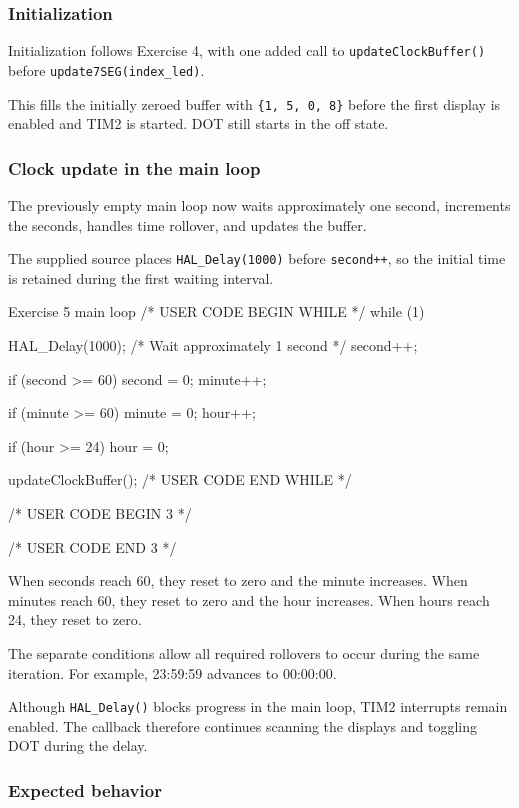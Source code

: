 \documentclass[a4paper]{article}
\begin{document}
\subsubsection{Initialization}

Initialization follows Exercise 4, with one added
call to \texttt{updateClockBuffer()} before
\texttt{update7SEG(index\_led)}.

This fills the initially zeroed buffer with
\texttt{\{1, 5, 0, 8\}} before the first display
is enabled and TIM2 is started. DOT still
starts in the off state.

\subsubsection{Clock update in the main loop}

The previously empty main loop now waits
approximately one second, increments the seconds,
handles time rollover, and updates the buffer.

The supplied source places \texttt{HAL\_Delay(1000)}
before \texttt{second++}, so the initial time
is retained during the first waiting interval.

\begin{stmcode}{Exercise 5 main loop}
/* USER CODE BEGIN WHILE */
while (1) {
    HAL_Delay(1000); /* Wait approximately 1 second */
    second++;

    if (second >= 60) {
      second = 0;
      minute++;
    }

    if (minute >= 60) {
      minute = 0;
      hour++;
    }

    if (hour >= 24) {
      hour = 0;
    }

    updateClockBuffer();
    /* USER CODE END WHILE */

    /* USER CODE BEGIN 3 */
}
/* USER CODE END 3 */
\end{stmcode}

When seconds reach 60, they reset to zero and
the minute increases. When minutes reach 60,
they reset to zero and the hour increases.
When hours reach 24, they reset to zero.

The separate conditions allow all required
rollovers to occur during the same iteration.
For example, 23:59:59 advances to 00:00:00.

Although \texttt{HAL\_Delay()} blocks progress
in the main loop, TIM2 interrupts remain enabled.
The callback therefore continues scanning the
displays and toggling DOT during the delay.

\subsubsection{Expected behavior}
\end{document}
